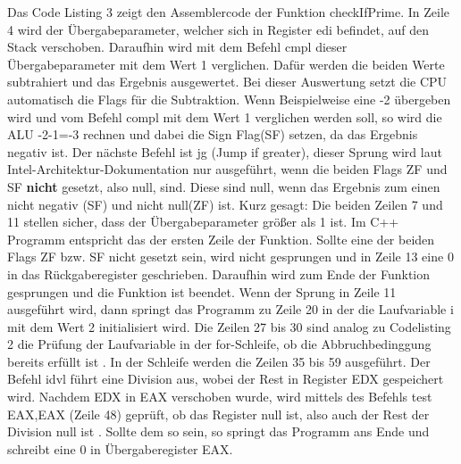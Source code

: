\documentclass[12pt]{article}
\begin{document}
Das Code Listing 3 zeigt den Assemblercode der Funktion checkIfPrime. In Zeile 4 wird der Übergabeparameter, welcher sich in Register edi befindet, auf den Stack verschoben. Daraufhin wird mit dem Befehl cmpl dieser Übergabeparameter mit dem Wert 1 verglichen. Dafür werden die beiden Werte subtrahiert und das Ergebnis ausgewertet. Bei dieser Auswertung setzt die CPU automatisch die Flags für die Subtraktion. Wenn Beispielweise eine -2 übergeben wird und vom Befehl compl mit dem Wert 1 verglichen werden soll, so wird die ALU -2-1=-3 rechnen und dabei die Sign Flag(SF) setzen, da das Ergebnis negativ ist. Der nächste Befehl ist jg (Jump if greater), dieser Sprung wird laut Intel-Architektur-Dokumentation nur ausgeführt, wenn die beiden Flags ZF und SF \textbf{nicht} gesetzt, also null, sind. Diese sind null, wenn das Ergebnis zum einen nicht negativ (SF) und nicht null(ZF) ist. \newline Kurz gesagt: Die beiden Zeilen 7 und 11 stellen sicher, dass der Übergabeparameter größer als 1 ist. Im C++ Programm entspricht das der ersten Zeile der Funktion. Sollte eine der beiden Flags ZF bzw. SF nicht gesetzt sein, wird nicht gesprungen und in Zeile 13 eine 0 in das Rückgaberegister geschrieben. Daraufhin wird zum Ende der Funktion gesprungen und die Funktion ist beendet. Wenn der Sprung in Zeile 11 ausgeführt wird, dann springt das Programm zu Zeile 20 in der die Laufvariable i  mit dem Wert 2 initialisiert wird. Die Zeilen 27 bis 30 sind analog zu Codelisting 2 die Prüfung der Laufvariable in der for-Schleife, ob die Abbruchbedinggung bereits erfüllt ist \cite{c}. In der Schleife werden die Zeilen 35 bis 59 ausgeführt. Der Befehl idvl führt eine Division aus, wobei der Rest in Register EDX gespeichert wird. Nachdem EDX in EAX verschoben wurde, wird mittels des Befehls test EAX,EAX (Zeile 48) geprüft, ob das Register null ist, also auch der Rest der Division null ist \cite{elements2005}. Sollte dem so sein, so springt das Programm ans Ende und schreibt eine 0 in Übergaberegister EAX.\cite[S.202]{technischeInformatik2}
\newpage

\listoftables
\newpage
{}
\listofcodes
\newpage
{}

\end{document}
